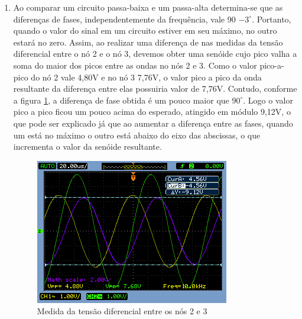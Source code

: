 \documentclass[a4paper]{article} %
\begin{document}
\begin{enumerate}
\item Ao comparar um circuito passa-baixa e um passa-alta determina-se que as diferenças de fases, independentemente da frequência, vale 90 $-3^{\circ}$.
Portanto, quando o valor do sinal em um circuito estiver em seu máximo, no outro estará no zero. Assim, ao realizar uma diferença de nas medidas da tensão diferencial entre o nó 2 e o nó 3, devemos obter uma senóide cujo pico valha a soma do maior dos picos entre as ondas no nós 2 e 3. Como o valor pico-a-pico do nó 2 vale 4,80V e no nó 3 7,76V, o valor pico a pico da onda resultante da diferença entre elas possuiria valor de 7,76V.
Contudo, conforme a figura \ref{fig:Fig-45}, a diferença de fase obtida é um pouco maior que $90^{\circ}$. Logo o valor pico a pico ficou um pouco acima do esperado, atingido em módulo 9,12V, o que pode ser explicado já que ao aumentar a diferença entre as fases, quando um está no máximo o outro está  abaixo do eixo das abscissas, o que incrementa o valor da senóide resultante.        

\begin{figure}[h]
\begin{centering}
\includegraphics[scale=0.7]{Imagens/45} \caption{Medida da tensão diferencial entre os nós 2 e 3 \label{fig:Fig-45}}
\par\end{centering}
\end{figure}

\end{enumerate}
\end{document}
